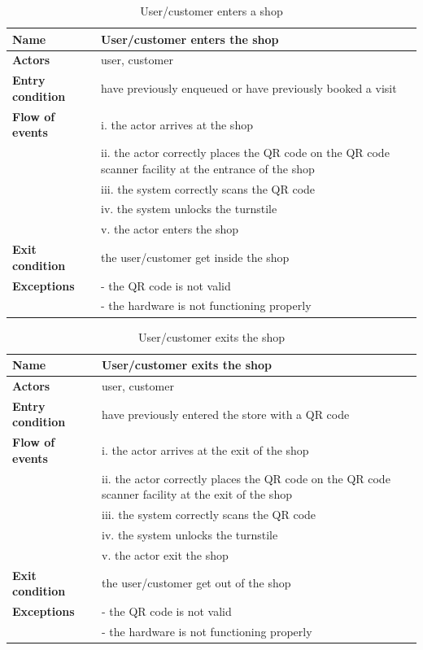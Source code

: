 \begin{table}[h!]
    \centering
    \begin{tabular}{@{}P{0.2\textwidth}P{0.70\textwidth}@{}}
        \toprule
        \textbf{Name}                 & User/customer enters the shop\\
        \midrule
        \textbf{Actors}               & user, customer\\
        \textbf{Entry condition}      & have previously enqueued or have previously booked a visit\\
        \textbf{Flow of events}            
        & i. the actor arrives at the shop\\
        & ii. the actor correctly places the QR code on the QR code scanner facility at the entrance of the shop\\
        & iii. the system correctly scans the QR code\\
        & iv. the system unlocks the turnstile\\
        & v. the actor enters the shop\\
        \textbf{Exit condition}       & the user/customer get inside the shop\\
        \textbf{Exceptions}           
        & - the QR code is not valid\\
        & - the hardware is not functioning properly\\
        \bottomrule
    \end{tabular}
\caption{User/customer enters a shop}
\label{table:entershop}
\end{table}

\begin{table}[h!]
    \centering
    \begin{tabular}{@{}P{0.2\textwidth}P{0.70\textwidth}@{}}
        \toprule
        \textbf{Name}                 & User/customer exits the shop\\
        \midrule
        \textbf{Actors}               & user, customer\\
        \textbf{Entry condition}      & have previously entered the store with a QR code\\
        \textbf{Flow of events}            
        & i. the actor arrives at the exit of the shop\\
        & ii. the actor correctly places the QR code on the QR code scanner facility at the exit of the shop\\
        & iii. the system correctly scans the QR code\\
        & iv. the system unlocks the turnstile\\
        & v. the actor exit the shop\\
        \textbf{Exit condition}       & the user/customer get out of the shop\\
        \textbf{Exceptions}           
        & - the QR code is not valid\\
        & - the hardware is not functioning properly\\
        \bottomrule
    \end{tabular}
\caption{User/customer exits the shop}
\label{table:exitshop}
\end{table}

